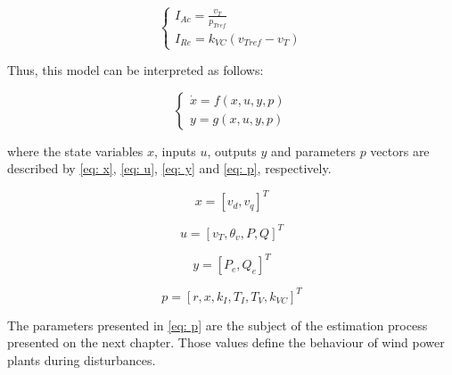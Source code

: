 \begin{equation*}
	\begin{cases}
		I_{Ac} = \frac{v_{T}}{p_{Tref}} \\
		I_{Re} = k_{VC}(v_{Tref} - v_{T})
	\end{cases}
\end{equation*}

Thus, this model can be interpreted as follows:

\begin{equation}
	\begin{cases}
		\dot{x} = f(x, u, y, p) \\
		y = g(x, u, y, p)
	\end{cases}
	\label{eq: xdot}
\end{equation}

\noindent where the state variables $x$, inputs $u$, outputs $y$ and parameters $p$ vectors are described by \eqref{eq: x}, \eqref{eq: u}, \eqref{eq: y} and \eqref{eq: p}, respectively.

\begin{equation}
	x = [v_{d}, v_{q}]^T
	\label{eq: x}
\end{equation}

\begin{equation}
	u = [v_{T}, \theta_{v}, P, Q]^T
	\label{eq: u}
\end{equation}

\begin{equation}
	y = [P_{e}, Q_{e}]^T
	\label{eq: y}
\end{equation}

\begin{equation}
	p = [r, x, k_{I}, T_{I}, T_{V}, k_{VC}]^T
	\label{eq: p}
\end{equation}

The parameters presented in \eqref{eq: p} are the subject of the estimation process presented on the next chapter. Those values define the behaviour of wind power plants during disturbances.
